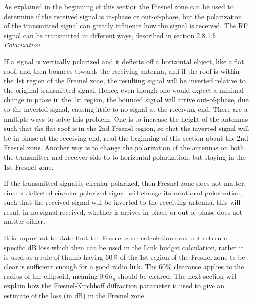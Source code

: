 As explained in the beginning of this section the Fresnel zone can be used to determine if the received signal is in-phase or out-of-phase, but the polarization of the transmitted signal can greatly influence how the signal is received. The RF signal can be transmitted in different ways, described in section 2.8.1.5 \textit{Polarization}.

If a signal is vertically polarized and it deflects off a horizontal object, like a flat roof, and then bounces towards the receiving antenna, and if the roof is within the 1st region of the Fresnel zone, the resulting signal will be inverted relative to the original transmitted signal. Hence, even though one would expect a minimal change in phase in the 1st region, the bounced signal will arrive out-of-phase, due to the inverted signal, causing little to no signal at the receiving end. There are a multiple ways to solve this problem. One is to increase the height of the antennas such that the flat roof is in the 2nd Fresnel region, so that the inverted signal will be in-phase at the receiving end, read the beginning of this section about the 2nd Fresnel zone. Another way is to change the polarization of the antennas on both the transmitter and receiver side to to horizontal polarization, but staying in the 1st Fresnel zone. 

If the transmitted signal is circular polarized, then Fresnel zone does not matter, since a deflected circular polarized signal will change its rotational polarization, such that the received signal will be inverted to the receiving antenna, this will result in no signal received, whether is arrives in-phase or out-of-phase does not matter either. 

It is important to state that the Fresnel zone calculation does not return a specific dB loss which then can be used in the Link budget calculation, rather it is used as a rule of thumb having 60\% of the 1st region of the Fresnel zone to be clear is sufficient enough for a good radio link. The 60\% clearance applies to the radius of the ellipsoid, meaning $0.6h_n$ should be cleared. The next section will explain how the Fresnel-Kirchhoff diffraction parameter is used to give an estimate of the loss (in dB) in the Fresnel zone. 

